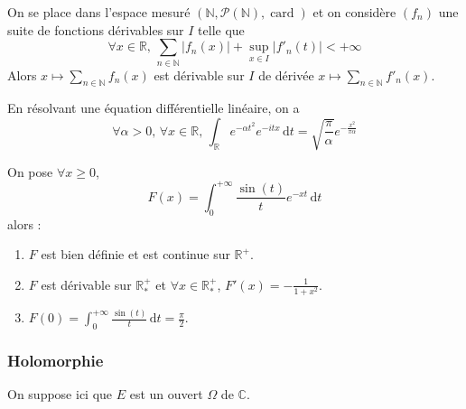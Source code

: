 
  \begin{example}
    On se place dans l'espace mesuré $(\mathbb{N}, \mathcal{P}(\mathbb{N}), \operatorname{card})$ et on considère $(f_n)$ une suite de fonctions dérivables sur $I$ telle que
    \[ \forall x \in \mathbb{R}, \, \sum_{n \in \mathbb{N}} |f_n(x)| + \sup_{x \in I} |f'_n(t)| < +\infty \]
    Alors $x \mapsto \sum_{n \in \mathbb{N}} f_n(x)$ est dérivable sur $I$ de dérivée $x \mapsto \sum_{n \in \mathbb{N}} f'_n(x)$.
  \end{example}


  \begin{application}
    En résolvant une équation différentielle linéaire, on a
    \[ \forall \alpha > 0, \, \forall x \in \mathbb{R}, \, \int_{\mathbb{R}} e^{-\alpha t^2} e^{-itx} \, \mathrm{d}t = \sqrt{\frac{\pi}{\alpha}} e^{-\frac{x^2}{\pi \alpha}} \]
  \end{application}


  \begin{application}
    On pose $\forall x \geq 0$,
    \[ F(x) = \int_0^{+\infty} \frac{\sin(t)}{t} e^{-xt} \, \mathrm{d}t \]
    alors :
    \begin{enumerate}[label=(\roman*)]
      \item $F$ est bien définie et est continue sur $\mathbb{R}^+$.
      \item $F$ est dérivable sur $\mathbb{R}^+_*$ et $\forall x \in \mathbb{R}^+_*$, $F'(x) = -\frac{1}{1+x^2}$.
      \item $F(0) = \int_0^{+\infty} \frac{\sin(t)}{t} \, \mathrm{d}t = \frac{\pi}{2}$.
    \end{enumerate}
  \end{application}

  \subsubsection{Holomorphie}


  On suppose ici que $E$ est un ouvert $\Omega$ de $\mathbb{C}$.

